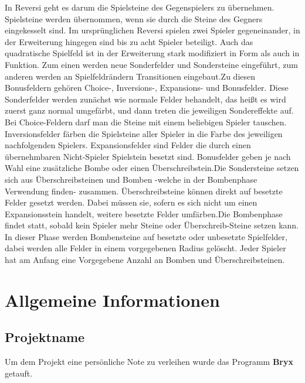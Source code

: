 \documentclass[12pt,a4paper]{article}
\begin{document}
In Reversi geht es darum die Spielsteine des Gegenspielers zu übernehmen. Spielsteine werden übernommen, wenn sie durch die Steine des Gegners eingekesselt sind. Im ursprünglichen Reversi spielen zwei Spieler gegeneinander, in der Erweiterung hingegen sind bis zu acht Spieler beteiligt. Auch das quadratische Spielfeld ist in der Erweiterung stark modifiziert in Form als auch in Funktion. Zum einen werden neue Sonderfelder und Sondersteine eingeführt, zum anderen werden an Spielfeldrändern Transitionen eingebaut.\newline Zu diesen Bonusfeldern gehören Choice-, Inversions-, Expansions- und Bonusfelder. Diese Sonderfelder werden zunächst wie normale Felder behandelt, das heißt es wird zuerst ganz normal umgefärbt, und dann treten die jeweiligen Sondereffekte auf. Bei Choice-Feldern darf man die Steine mit einem beliebigen Spieler tauschen. Inversionsfelder färben die Spielsteine aller Spieler in die Farbe des jeweiligen nachfolgenden Spielers. Expansionsfelder sind Felder die durch einen übernehmbaren Nicht-Spieler Spielstein besetzt sind. Bonusfelder geben je nach Wahl eine zusätzliche Bombe oder einen Überschreibstein.\newline Die Sondersteine setzen sich aus Überschreibsteinen und Bomben -welche in der Bombenphase Verwendung finden- zusammen. Überschreibsteine können direkt auf besetzte Felder gesetzt werden. Dabei müssen sie, sofern es sich nicht um einen Expansionsstein handelt, weitere besetzte Felder umfärben.Die Bombenphase findet statt, sobald kein Spieler mehr Steine oder Überschreib-Steine setzen kann. In dieser Phase werden Bombensteine auf besetzte oder unbesetzte Spielfelder, dabei werden alle Felder in einem vorgegebenen Radius gelöscht. Jeder Spieler hat am Anfang eine Vorgegebene Anzahl an Bomben und Überschreibsteinen.
\newpage
\section{Allgemeine Informationen}

\subsection{Projektname}
Um dem Projekt eine persönliche Note zu verleihen wurde das Programm \glqq \textbf{Bryx}\grqq{} getauft.
\end{document}
